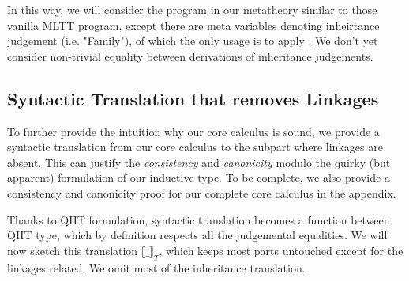 In this way, we will consider the program in our metatheory similar to those vanilla MLTT program, except there are meta variables denoting inheirtance judgement (i.e. "Family"), of which the only usage is to apply . We don't yet consider non-trivial equality between derivations of inheritance judgements.


\subsection{Syntactic Translation that removes Linkages}
To further provide the intuition why our core calculus is sound, we provide a syntactic translation from our core calculus to the subpart where linkages are absent. This can justify the \textit{consistency} and \textit{canonicity} modulo the quirky (but apparent) formulation of our inductive type. To be complete, we also provide a consistency and canonicity proof for our complete core calculus in the appendix.

\newcommand{\denotesT}[1]{{{\llbracket {#1} \rrbracket}_T}}
\newcommand{\Sigr}[2]{{ "Sig"^r~{#1}~{#2} }}

Thanks to QIIT formulation, syntactic translation becomes a function between QIIT type, which by definition respects all the judgemental equalities. We will now sketch this translation $\denotesT{\_}$, which keeps most parts untouched except for the linkages related. We omit most of the inheritance translation.



